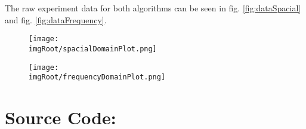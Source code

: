 \documentclass[a4paper,headings=small]{scrartcl}
\numberwithin{equation}{section} %
\numberwithin{figure}{section}   %
\newcommand{\imgRoot}{../resources/img}
\begin{document}
The raw experiment data for both algorithms can be seen in
fig. \ref{fig:dataSpacial} and fig. \ref{fig:dataFrequency}.

\begin{figure}[ht]
	\texttt{[image: \\imgRoot/spacialDomainPlot.png]}
	\label{fig:plotSpacial}
\end{figure}

\begin{figure}[ht]
	\texttt{[image: \\imgRoot/frequencyDomainPlot.png]}
	\label{fig:plotFrequency}
\end{figure}

\begin{figure}[ht]
	\centering

	\label{fig:data}
\end{figure}

\newpage
\section{Source Code:}


\end{document}
